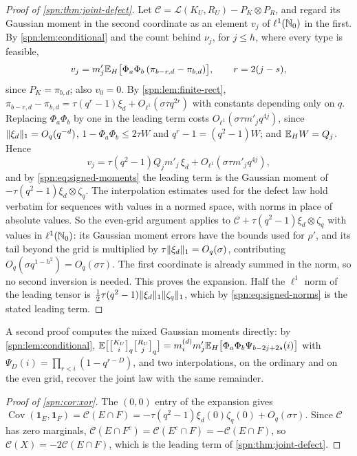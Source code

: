 \begin{proof}[Proof of \cref{spn:thm:joint-defect}]
Let $\mathcal C=\mathcal L(K_U,R_U)-P_K\otimes P_R$, and regard its Gaussian moment in the second
coordinate as an element $v_j$ of $\ell^1(\mathbb{N}_0)$ in the first. By \cref{spn:lem:conditional} and
the count behind $\nu_j$, for $j\le h$, where every type is feasible,
\[
 v_j=m'_j\mathbb{E}_H\bigl[\Phi_a\Phi_b\,(\pi_{b-r,d}-\pi_{b,d})\bigr],\qquad r=2(j-s),
\]
since $P_K=\pi_{b,d}$; also $v_0=0$. By \cref{spn:lem:finite-rect},
$\pi_{b-r,d}-\pi_{b,d}=\tau(q^r-1)\xi_d+O_{\ell^1}(\sigma\tau q^{2r})$ with constants depending only on
$q$. Replacing $\Phi_a\Phi_b$ by one in the leading term costs
$O_{\ell^1}(\sigma\tau m'_jq^{4j})$, since $\lVert\xi_d\rVert_1=O_q(q^{-d})$,
$1-\Phi_a\Phi_b\le2\tau W$ and $q^r-1=(q^2-1)W$; and $\mathbb{E}_HW=Q_j$. Hence
\[
 v_j=\tau(q^2-1)Q_jm'_j\,\xi_d+O_{\ell^1}(\sigma\tau m'_jq^{4j}),
\]
and by \eqref{spn:eq:signed-moments} the leading term is the Gaussian moment of
$-\tau(q^2-1)\xi_d\otimes\zeta_q$. The interpolation estimates used for the defect law hold
verbatim for sequences with values in a normed space, with norms in place of absolute values. So
the even-grid argument applies to $\mathcal C+\tau(q^2-1)\xi_d\otimes\zeta_q$ with values in
$\ell^1(\mathbb{N}_0)$: its Gaussian moment errors have the bounds used for $\rho'$, and its tail beyond the
grid is multiplied by $\tau\lVert\xi_d\rVert_1=O_q(\sigma)$, contributing
$O_q(\sigma q^{1-h^2})=O_q(\sigma\tau)$. The first coordinate is already summed in the norm, so no
second inversion is needed. This proves the expansion. Half the $\ell^1$ norm of the leading
tensor is $\frac12\tau(q^2-1)\lVert\xi_d\rVert_1\lVert\zeta_q\rVert_1$, which by \eqref{spn:eq:signed-norms}
is the stated leading term.
\end{proof}

A second proof computes the mixed Gaussian moments directly: by \cref{spn:lem:conditional},
$\spnE\bigl[\spnqbin{K_U}iq\spnqbin{R_U}jq\bigr]=m_i^{(d)}m'_j\spnE_H\bigl[\Phi_a\Phi_b
\Psi_{b-2j+2s}(i)\bigr]$ with $\Psi_D(i)=\prod_{r<i}(1-q^{r-D})$, and two interpolations, on the
ordinary and on the even grid, recover the joint law with the same remainder.

\begin{proof}[Proof of \cref{spn:cor:xor}]
The $(0,0)$ entry of the expansion gives
$\operatorname{Cov}(\mathbf 1_E,\mathbf 1_F)=\mathcal C(E\cap F)=-\tau(q^2-1)\xi_d(0)\zeta_q(0)
+O_q(\sigma\tau)$. Since $\mathcal C$ has zero marginals, $\mathcal C(E\cap F^c)=\mathcal C(E^c\cap
F)=-\mathcal C(E\cap F)$, so $\mathcal C(X)=-2\mathcal C(E\cap F)$, which is the leading term of
\cref{spn:thm:joint-defect}.
\end{proof}

